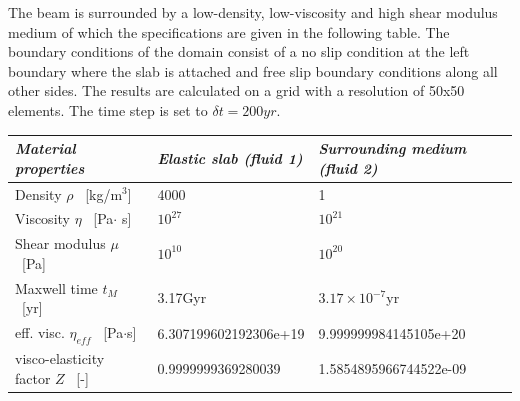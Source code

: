 The beam is surrounded by a low-density, low-viscosity and high shear modulus medium 
of which the specifications are given in  the following table.
The boundary conditions of the domain consist of a no slip condition at 
the left boundary where the slab is attached and free slip boundary conditions along all other sides. 
The results are calculated on a grid with a resolution of 50x50 elements.
The time step is set to $\delta t = 200yr$.

\begin{center}
\begin{tabular}{lll}
\hline 
\textit{Material properties}& \textit{Elastic slab (fluid 1)}  & \textit{Surrounding medium (fluid 2)} \\
\hline 
\hline 
Density         $\rho$ \     [kg/m$^{3}$]      & 4000                    & 1     \\
Viscosity       $\eta$ \    [Pa$\cdot$ s]      & $10^{27}$               &   $10^{21}$     \\
Shear modulus   $\mu $ \    [Pa]               & $10^{10}$               & $10^{20}$       \\
Maxwell time $t_M$     \    [yr]               & 3.17Gyr                 &  $3.17\times10^{-7}$yr       \\
eff. visc.      $\eta_{eff}$ \ [Pa$\cdot$s]    & 6.307199602192306e+19   &  9.999999984145105e+20      \\
visco-elasticity factor $Z$      \ [-]         & 0.9999999369280039      &  1.5854895966744522e-09     \\
\hline 
\end{tabular} 
\end{center}

